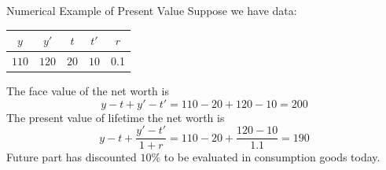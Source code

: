 \documentclass[11pt,aspectratio=43]{beamer}
\theoremstyle{definition}
\begin{document}
\begin{frame}{Numerical Example of Present Value}
\label{slide:Numerical_Example_of_Present_Value}
    Suppose we have data:
    \begin{tabular}{| c | c | c | c | c | }
        \hline
        $ y $
            & $ y' $
            & $ t $
            & $ t' $
            & $ r $
        \\
        \hline
        \hline
        $ 110 $
            & $120$
            & $ 20 $
            & $ 10 $
            & 0.1
        \\
        \hline
    \end{tabular}

    The face value of the net worth is
    \begin{equation*}
        y - t + y' - t' = 110 - 20 + 120 - 10 = 200
    \end{equation*}
    The present value of lifetime the net worth is
    \begin{equation*}
        y - t + \frac{y' - t'}{1+r} = 110 - 20 + \frac{120 - 10}{1.1} = 190
    \end{equation*}
    Future part has discounted $ 10\% $ to be evaluated in consumption goods today.
\end{frame}
\end{document}
